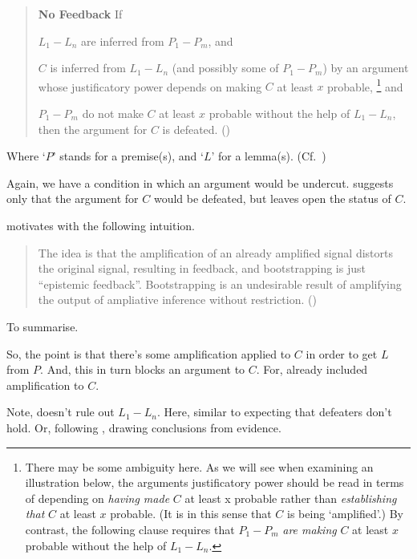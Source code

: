 \begin{note}[No feedback]
  \begin{quote}
    \textbf{No Feedback} If
    \begin{enumerate*}[label=(\roman*)]
    \item\label{W:NF:i} \(L_{1}-L_{n}\) are inferred from \(P_{1}-P_{m}\), and
    \item\label{W:NF:ii} \(C\) is inferred from \(L_{1}-L_{n}\) (and possibly some of \(P_{1}-P_{m}\)) by an argument whose justificatory power depends on making \(C\) at least \(x\) probable,\nolinebreak
      \footnote{
        There may be some ambiguity here.
        As we will see when examining an illustration below, the arguments justificatory power should be read in terms of depending on \emph{having made} \(C\) at least x probable rather than \emph{establishing that} \(C\) at least \(x\) probable.
        (It is in this sense that \(C\) is being `amplified'.)
        By contrast, the following clause requires that \(P_{1}-P_{m}\) \emph{are making} \(C\) at least \(x\) probable without the help of \(L_{1}-L_{n}\).
      }
      and
    \item\label{W:NF:iii} \(P_{1}-P_{m}\) do not make \(C\) at least \(x\) probable without the help of \(L_{1}-L_{n}\), then the argument for \(C\) is defeated.\linebreak
      \mbox{}\hfill\mbox{(\Citeyear[533--534]{Weisberg:2010to})}
    \end{enumerate*}
  \end{quote}
  Where `\(P\)' stands for a premise(s), and `\(L\)' for a lemma(s). (Cf.~\Citeyear[533]{Weisberg:2010to})

  Again, we have a condition in which an argument would be undercut.
  \wnf{} suggests only that the argument for \(C\) would be defeated, but leaves open the status of \(C\).
\end{note}

\begin{note}
  \citeauthor{Weisberg:2010to} motivates with the following intuition.
  \begin{quote}
    The idea is that the ampliﬁcation of an already ampliﬁed signal distorts the original signal, resulting in feedback, and bootstrapping is just ``epistemic feedback''.
    Bootstrapping is an undesirable result of amplifying the output of ampliative inference without restriction.\linebreak
    \mbox{}\hfill\mbox{(\Citeyear[534]{Weisberg:2010to})}
  \end{quote}

  To summarise.
  {
    \color{red}
    So, the point is that there's some amplification applied to \(C\) in order to get \(L\) from \(P\).
    And, this in turn blocks an argument to \(C\).
    For, already included amplification to \(C\).
    
  }
  {
    \color{red}
    Note, doesn't rule out \(L_{1}-L_{n}\).
    Here, similar to expecting that defeaters don't hold.
    Or, following \citeauthor{Weisberg:2010to}, drawing conclusions from evidence.
  }
\end{note}

